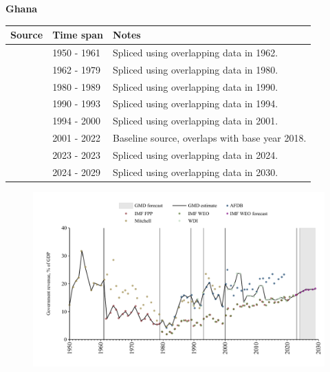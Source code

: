 \documentclass[12pt,a4paper,landscape]{article}
\begin{document}
\begin{adjustbox}{max totalsize={\paperwidth}{\paperheight},center}
\begin{minipage}[t][\textheight][t]{\textwidth}
\vspace*{0.5cm}
{}
\begin{center}
{\Large\bfseries Ghana}
\end{center}
\vspace{0.5cm}
\begin{table}[H]
\centering
\small
\begin{tabular}{|l|l|l|}
\hline
\textbf{Source} & \textbf{Time span} & \textbf{Notes} \\
\hline
\rowcolor{white}\cite{Mitchell}& 1950 - 1961 &Spliced using overlapping data in 1962.\\
\rowcolor{lightgray}\cite{IMF_FPP}& 1962 - 1979 &Spliced using overlapping data in 1980.\\
\rowcolor{white}\cite{AFDB}& 1980 - 1989 &Spliced using overlapping data in 1990.\\
\rowcolor{lightgray}\cite{WDI}& 1990 - 1993 &Spliced using overlapping data in 1994.\\
\rowcolor{white}\cite{AFDB}& 1994 - 2000 &Spliced using overlapping data in 2001.\\
\rowcolor{lightgray}\cite{WDI}& 2001 - 2022 &Baseline source, overlaps with base year 2018.\\
\rowcolor{white}\cite{IMF_FPP}& 2023 - 2023 &Spliced using overlapping data in 2024.\\
\rowcolor{lightgray}\cite{IMF_WEO_forecast}& 2024 - 2029 &Spliced using overlapping data in 2030.\\
\hline
\end{tabular}
\end{table}
\begin{figure}[H]
\centering
\includegraphics[width=\textwidth,height=0.6\textheight,keepaspectratio]{graphs/GHA_govrev_GDP.pdf}
\end{figure}
\end{minipage}
\end{adjustbox}
\end{document}
